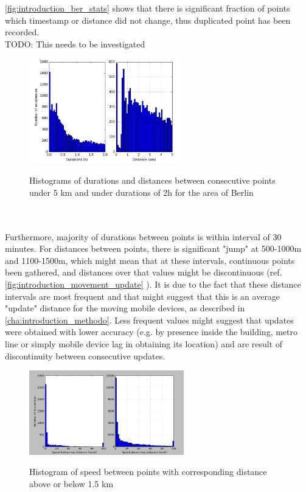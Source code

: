 \autoref{fig:introduction_ber_stats} shows that there is significant fraction of points which timestamp or distance did not change, thus duplicated point has been recorded. 
\\
TODO: This needs to be investigated
\\
\begin{figure}[!ht]
	\centering
	\includegraphics[width=0.6\textwidth]{images/berlin_stats_intro.png}\\
	\caption{Histograms of durations and distances between consecutive points under 5 km and under durations of 2h for the area of Berlin}
	\label{fig:introduction_ber_stats}
\end{figure}
\\\\
Furthermore, majority of durations between points is within interval of 30 minutes. For distances between points, there is significant "jump" at 500-1000m and 1100-1500m, which might mean that at these intervals, continuous points been gathered, and distances over that values might be discontinuous (ref. \autoref{fig:introduction_movement_update} ). It is due to the fact that these distance intervals are most frequent and that might suggest that this is an average "update" distance for the moving mobile devices, as described in \autoref{cha:introduction_methodo}. Less frequent values might suggest that updates were obtained with lower accuracy (e.g. by presence inside the building, metro line or simply mobile device lag in obtaining its location) and are result of discontinuity between consecutive updates.
\begin{figure}[!ht]
	\centering
	\includegraphics[width=0.6\textwidth]{images/berlin_speeds_distances.png}\\
	\caption{Histogram of speed between points with corresponding distance above or below 1.5 km}
	\label{fig:introduction_ber_sp_dis}
\end{figure}
